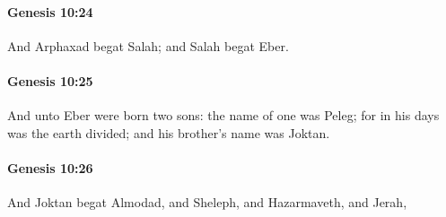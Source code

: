 		\paragraph{Genesis 10:24} %
			\label{GENESIS-10-24}

			And Arphaxad begat Salah; and Salah begat Eber.


		\paragraph{Genesis 10:25} %
			\label{GENESIS-10-25}

			And unto Eber were born two sons: the name of one was Peleg; for in his days was the earth divided; and his brother's name was Joktan.


		\paragraph{Genesis 10:26} %
			\label{GENESIS-10-26}

			And Joktan begat Almodad, and Sheleph, and Hazarmaveth, and Jerah,


